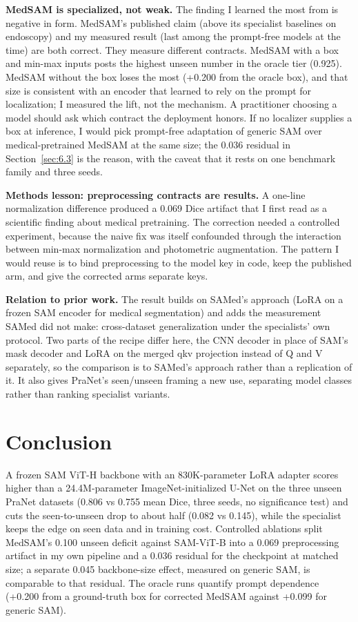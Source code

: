 \documentclass[conference]{IEEEtran}
\begin{document}
\textbf{MedSAM is specialized, not weak.} The finding I learned the most from is negative in form. MedSAM's published claim (above its specialist baselines on endoscopy) and my measured result (last among the prompt-free models at the time) are both correct. They measure different contracts. MedSAM with a box and min-max inputs posts the highest unseen number in the oracle tier (0.925). MedSAM without the box loses the most (+0.200 from the oracle box), and that size is consistent with an encoder that learned to rely on the prompt for localization; I measured the lift, not the mechanism. A practitioner choosing a model should ask which contract the deployment honors. If no localizer supplies a box at inference, I would pick prompt-free adaptation of generic SAM over medical-pretrained MedSAM at the same size; the 0.036 residual in Section~\ref{sec:6.3} is the reason, with the caveat that it rests on one benchmark family and three seeds.

\textbf{Methods lesson: preprocessing contracts are results.} A one-line normalization difference produced a 0.069 Dice artifact that I first read as a scientific finding about medical pretraining. The correction needed a controlled experiment, because the naive fix was itself confounded through the interaction between min-max normalization and photometric augmentation. The pattern I would reuse is to bind preprocessing to the model key in code, keep the published arm, and give the corrected arms separate keys.

\textbf{Relation to prior work.} The result builds on SAMed's approach (LoRA on a frozen SAM encoder for medical segmentation) and adds the measurement SAMed did not make: cross-dataset generalization under the specialists' own protocol. Two parts of the recipe differ here, the CNN decoder in place of SAM's mask decoder and LoRA on the merged qkv projection instead of Q and V separately, so the comparison is to SAMed's approach rather than a replication of it. It also gives PraNet's seen/unseen framing a new use, separating model classes rather than ranking specialist variants.


\section{Conclusion}\label{sec:8}
A frozen SAM ViT-H backbone with an 830K-parameter LoRA adapter scores higher than a 24.4M-parameter ImageNet-initialized U-Net on the three unseen PraNet datasets (0.806 vs 0.755 mean Dice, three seeds, no significance test) and cuts the seen-to-unseen drop to about half (0.082 vs 0.145), while the specialist keeps the edge on seen data and in training cost. Controlled ablations split MedSAM's 0.100 unseen deficit against SAM-ViT-B into a 0.069 preprocessing artifact in my own pipeline and a 0.036 residual for the checkpoint at matched size; a separate 0.045 backbone-size effect, measured on generic SAM, is comparable to that residual. The oracle runs quantify prompt dependence (+0.200 from a ground-truth box for corrected MedSAM against +0.099 for generic SAM).
\end{document}
